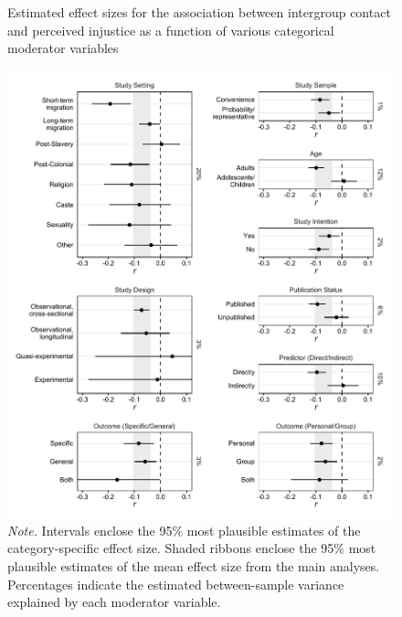 \documentclass[twocolumn, 11pt, letterpaper]{article}
\begin{document}
\begin{figure}
\centering
\caption{Estimated effect sizes for the association between intergroup contact and perceived injustice as a function of various categorical moderator variables}
\includegraphics[scale=1]{../figures/figure-4}
\caption*{\textit{Note.} Intervals enclose the 95\% most plausible estimates of the category-specific effect size. Shaded ribbons enclose the 95\% most plausible estimates of the mean effect size from the main analyses. Percentages indicate the estimated between-sample variance explained by each moderator variable.}
\label{fig:f4}
\end{figure}
\end{document}
